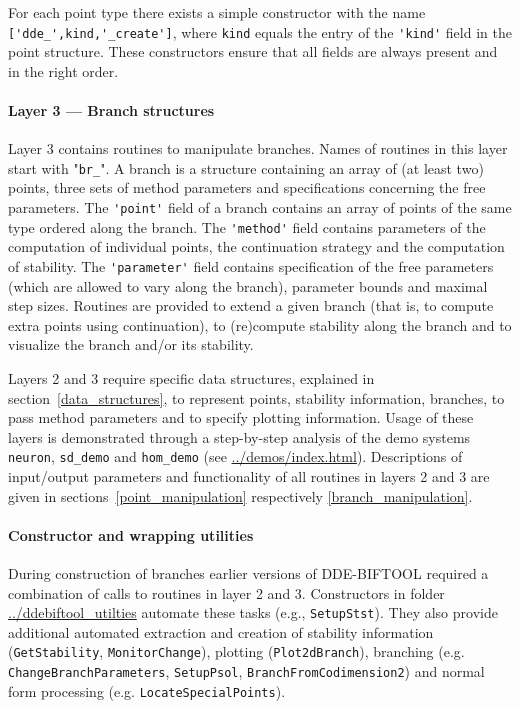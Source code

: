 \documentclass[10pt]{scrartcl}
\newcommand{\DDEBIFCODE}{\textsc{DDE-BIFTOOL}}
\newcommand{\demobase}{\url{../demos/index.html}}
\newcommand{\blist}[1]{\mbox{\lstinline!#1!}}
\begin{document}
For each point type there exists a simple constructor with the name
\blist{['dde_',kind,'_create']}, where \blist{kind} equals the entry
of the \blist{'kind'} field in the point structure. These constructors
ensure that all fields are always present and in the right order.

\paragraph{Layer 3 --- Branch structures}
Layer 3 contains routines to manipulate branches.  Names of routines
in this layer start with "\blist{br_}". A branch is a structure
containing an array of (at least two) points, three sets of method
parameters and specifications concerning the free parameters.  The
\blist{'point'} field of a branch contains an array of points of the
same type ordered along the branch.  The \blist{'method'} field
contains parameters of the computation of individual points, the
continuation strategy and the computation of stability.  The
\blist{'parameter'} field contains specification of the free
parameters (which are allowed to vary along the branch), parameter
bounds and maximal step sizes.  Routines are provided to extend a
given branch (that is, to compute extra points using continuation), to
(re)compute stability along the branch and to visualize the branch
and/or its stability.

Layers 2 and 3 require specific data structures, explained in
section~\ref{data_structures}, to represent points, stability
information, branches, to pass method parameters and to specify
plotting information.  Usage of these layers is
demonstrated %
through a step-by-step analysis of the demo systems \texttt{neuron},
\texttt{sd\_demo} and \texttt{hom\_demo} (see
\demobase{}).  Descriptions of input/output parameters and
functionality of all routines in layers 2 and 3 are given in
sections~\ref{point_manipulation} respectively
\ref{branch_manipulation}.

\paragraph{Constructor and wrapping utilities}
During construction of branches earlier versions of \DDEBIFCODE{}
required a combination of calls to routines in layer 2 and
3. Constructors in folder \url{../ddebiftool_utilties} automate these
tasks (e.g., \blist{SetupStst}). They also provide additional
automated extraction and creation of stability information
(\blist{GetStability}, \blist{MonitorChange}), plotting
(\blist{Plot2dBranch}), branching
(e.g. \blist{ChangeBranchParameters}, \blist{SetupPsol},
\blist{BranchFromCodimension2}) and normal form processing
(e.g. \blist{LocateSpecialPoints}).
\end{document}
